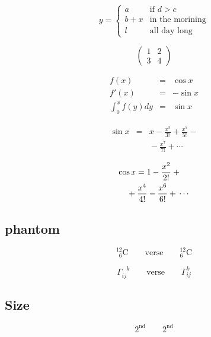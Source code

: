 \documentclass[a4paper, 11pt]{article}
\begin{document}
\begin{displaymath}
y = \left\{\begin{array}{ll}
a & \textrm{if $d>c$}\\
b+x & \textrm{in the morining}\\
l & \textrm{all day long}
\end{array}\right.
\end{displaymath}

\begin{displaymath}
\left(\begin{array}{c|c}
1 & 2\\
\hline
3 & 4
\end{array}\right)
\end{displaymath}

\begin{eqnarray}
f(x) & = & \cos x \\
f'(x) & = & - \sin x \\
\int_{0}^{x} f(y) dy & = & \sin x  
\end{eqnarray}

{\setlength\arraycolsep{2pt}
\begin{eqnarray}
\sin x & = & x - \frac{x^3}{3!} + \frac{x^5}{5!}-{}
\nonumber\\
&& {}-\frac{x^7}{7!}+{}\cdots
\end{eqnarray}}

\begin{eqnarray}
\lefteqn{ \cos x = 1-\frac{x^2}{2!} + {}}
\nonumber\\
& & {}+\frac{x^4}{4!} - \frac{x^6}{6!}+{}\cdots
\end{eqnarray}

\subsection{phantom}
\begin{displaymath}
{}^{12}_{\phantom{1}6}\textrm{C}\qquad
\textrm{verse} \qquad
{}^{12}_{6}\textrm{C}
\end{displaymath}

\begin{displaymath}
\Gamma_{ij}^{\phantom{ij}k} \qquad
\textrm{verse} \qquad
\Gamma_{ij}^{k}
\end{displaymath}

\subsection{Size}
\begin{equation}
2^{\textrm{nd}}\qquad
2^{\mathrm{nd}}
\end{equation}
\end{document}
